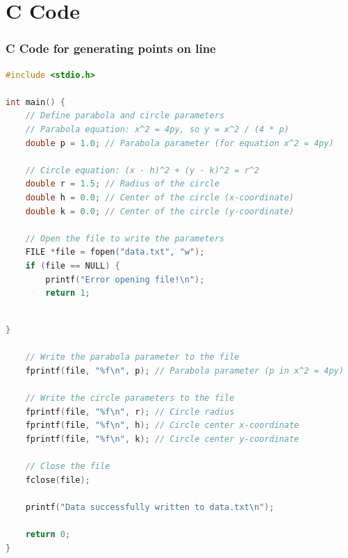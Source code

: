 \documentclass{beamer}
\theoremstyle{remark}
\numberwithin{equation}{section}
\begin{document}
\section{C Code}
\begin{frame}[fragile]
\frametitle{C Code for generating points on line}
\begin{lstlisting}[language=C]
#include <stdio.h>

int main() {
    // Define parabola and circle parameters
    // Parabola equation: x^2 = 4py, so y = x^2 / (4 * p)
    double p = 1.0; // Parabola parameter (for equation x^2 = 4py)

    // Circle equation: (x - h)^2 + (y - k)^2 = r^2
    double r = 1.5; // Radius of the circle
    double h = 0.0; // Center of the circle (x-coordinate)
    double k = 0.0; // Center of the circle (y-coordinate)

    // Open the file to write the parameters
    FILE *file = fopen("data.txt", "w");
    if (file == NULL) {
        printf("Error opening file!\n");
        return 1;
    
\end{lstlisting}
\end{frame}

\begin{frame}[fragile]
\begin{lstlisting}[language=C]
}

    // Write the parabola parameter to the file
    fprintf(file, "%f\n", p); // Parabola parameter (p in x^2 = 4py)

    // Write the circle parameters to the file
    fprintf(file, "%f\n", r); // Circle radius
    fprintf(file, "%f\n", h); // Circle center x-coordinate
    fprintf(file, "%f\n", k); // Circle center y-coordinate

    // Close the file
    fclose(file);

    printf("Data successfully written to data.txt\n");

    return 0;
}
    
\end{lstlisting}
\end{frame}
\end{document}
